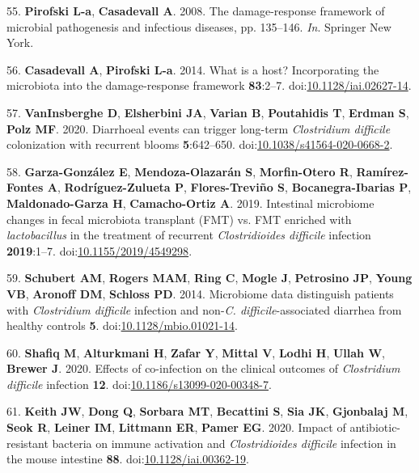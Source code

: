 \documentclass[
  12pt,
]{article}
\newenvironment{cslreferences}%
  {}%
  {\par}
\begin{document}
\begin{cslreferences}
\leavevmode\hypertarget{ref-Pirofski2008}{}%
55. \textbf{Pirofski L-a}, \textbf{Casadevall A}. 2008. The
damage-response framework of microbial pathogenesis and infectious
diseases, pp. 135--146. \emph{In}. Springer New York.

\leavevmode\hypertarget{ref-Casadevall2014}{}%
56. \textbf{Casadevall A}, \textbf{Pirofski L-a}. 2014. What is a host?
Incorporating the microbiota into the damage-response framework
\textbf{83}:2--7.
doi:\href{https://doi.org/10.1128/iai.02627-14}{10.1128/iai.02627-14}.

\leavevmode\hypertarget{ref-VanInsberghe2020}{}%
57. \textbf{VanInsberghe D}, \textbf{Elsherbini JA}, \textbf{Varian B},
\textbf{Poutahidis T}, \textbf{Erdman S}, \textbf{Polz MF}. 2020.
Diarrhoeal events can trigger long-term \emph{Clostridium difficile}
colonization with recurrent blooms \textbf{5}:642--650.
doi:\href{https://doi.org/10.1038/s41564-020-0668-2}{10.1038/s41564-020-0668-2}.

\leavevmode\hypertarget{ref-GarzaGonzalez2019}{}%
58. \textbf{Garza-González E}, \textbf{Mendoza-Olazarán S},
\textbf{Morfin-Otero R}, \textbf{Ramírez-Fontes A},
\textbf{Rodríguez-Zulueta P}, \textbf{Flores-Treviño S},
\textbf{Bocanegra-Ibarias P}, \textbf{Maldonado-Garza H},
\textbf{Camacho-Ortiz A}. 2019. Intestinal microbiome changes in fecal
microbiota transplant (FMT) vs. FMT enriched with \emph{lactobacillus}
in the treatment of recurrent \emph{Clostridioides difficile} infection
\textbf{2019}:1--7.
doi:\href{https://doi.org/10.1155/2019/4549298}{10.1155/2019/4549298}.

\leavevmode\hypertarget{ref-Schubert2014}{}%
59. \textbf{Schubert AM}, \textbf{Rogers MAM}, \textbf{Ring C},
\textbf{Mogle J}, \textbf{Petrosino JP}, \textbf{Young VB},
\textbf{Aronoff DM}, \textbf{Schloss PD}. 2014. Microbiome data
distinguish patients with \emph{Clostridium difficile} infection and
non-\emph{C. difficile}-associated diarrhea from healthy controls
\textbf{5}.
doi:\href{https://doi.org/10.1128/mbio.01021-14}{10.1128/mbio.01021-14}.

\leavevmode\hypertarget{ref-Shafiq2020}{}%
60. \textbf{Shafiq M}, \textbf{Alturkmani H}, \textbf{Zafar Y},
\textbf{Mittal V}, \textbf{Lodhi H}, \textbf{Ullah W}, \textbf{Brewer
J}. 2020. Effects of co-infection on the clinical outcomes of
\emph{Clostridium difficile} infection \textbf{12}.
doi:\href{https://doi.org/10.1186/s13099-020-00348-7}{10.1186/s13099-020-00348-7}.

\leavevmode\hypertarget{ref-Keith2020}{}%
61. \textbf{Keith JW}, \textbf{Dong Q}, \textbf{Sorbara MT},
\textbf{Becattini S}, \textbf{Sia JK}, \textbf{Gjonbalaj M},
\textbf{Seok R}, \textbf{Leiner IM}, \textbf{Littmann ER}, \textbf{Pamer
EG}. 2020. Impact of antibiotic-resistant bacteria on immune activation
and \emph{Clostridioides difficile} infection in the mouse intestine
\textbf{88}.
doi:\href{https://doi.org/10.1128/iai.00362-19}{10.1128/iai.00362-19}.


\end{cslreferences}
\end{document}
